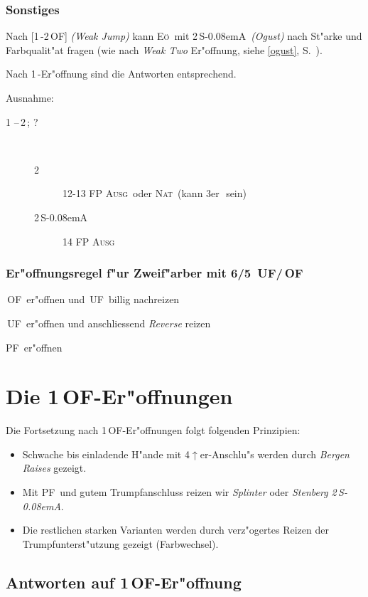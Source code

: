 \documentclass[11pt,german,twocolumn]{scrartcl}
\renewcommand{\Cl}{{\color{ClColor}{$\clubsuit$}}}
\renewcommand{\Di}{{\color{DiColor}{$\vardiamondsuit$}}}
\def\kar{\,\Di}
\def\tre{\,\Cl}
\def\pl{$\uparrow$}
\def\uf{\textsf{\,UF}}
\def\of{\textsf{\,OF}}
\def\SA{\textsf{\,S\kern-0.08emA}}
\def\sep{\,--\,}
\newcommand{\conv}[1]{\emph{#1}}
\def\bal{\textsc{Ausg}}
\def\nat{\textsc{Nat}}
\def\pf{\textsc{PF}}
\def\eo{\textsc{E\"o}}
\def\bdsc{\begin{description}}
\def\edsc{\end{description}}
\begin{document}
\subsubsection*{Sonstiges}

Nach [1\tre-2\of] \conv{(Weak Jump)} kann \eo\ mit 2\SA\
\conv{(Ogust)} nach St"arke und Farbqualit"at fragen (wie nach
\conv{Weak Two} Er"offnung, siehe \ref{ogust}, S.~\pageref{ogust}).

Nach 1\kar{}-Er"offnung sind die Antworten entsprechend.

Ausnahme:
\bdsc
  \item[1\kar\sep2\tre; ?]~
    \bdsc
    \item[2\kar] 12-13 FP \bal\ oder \nat\ (kann 3er\kar\ sein)
    \item[2\SA] 14 FP \bal
    \edsc
\edsc
        

\subsubsection*{\label{zfregel}Er"offnungsregel f"ur Zweif"arber mit 6/5 \uf/\of}

\bdsc
\setlength{\labelsep}{1ex}
\item[4\pl{} Verlierer:] \of\ er"offnen und \uf\ billig nachreizen
\item[3-4 Verlierer:] \uf\ er"offnen und anschliessend \conv{Reverse}
  reizen
\item[0-2 Verlierer:] \pf\ er"offnen
\edsc

\section{Die 1\of-Er"offnungen}

Die Fortsetzung nach 1\of-Er"offnungen folgt folgenden Prinzipien:
\begin{itemize}
\setlength{\itemsep}{0.5ex}
\item Schwache bis einladende H"ande mit 4\pl{}er-Anschlu"s werden durch
  \conv{Bergen Raises} gezeigt.
\item Mit \pf\ und gutem Trumpfanschluss reizen wir
  \conv{Splinter} oder \conv{Stenberg 2\SA}.
\item Die restlichen starken Varianten werden durch verz"ogertes
  Reizen der Trumpfunterst"utzung gezeigt (Farbwechsel).
\end{itemize}

\subsection{Antworten auf 1\of-Er"offnung}
\end{document}
